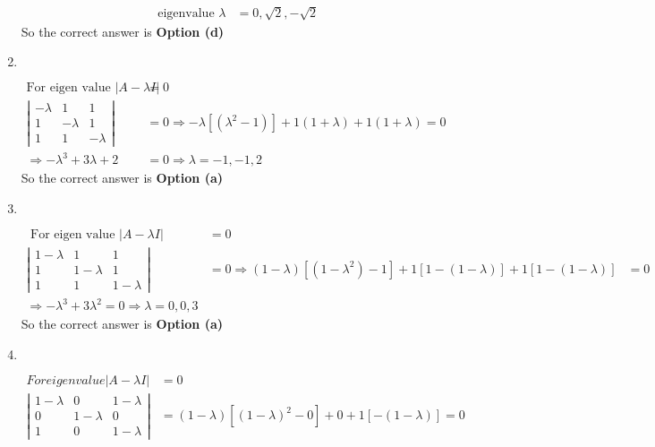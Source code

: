 \begin{enumerate}
\begin{answer}
\begin{align*}
		\text { eigenvalue } \lambda&=0, \sqrt{2},-\sqrt{2}
		\end{align*}
		So the correct answer is \textbf{Option (d)}
	\end{answer}
	\item $\left. \right. $
	\begin{answer}
		\begin{align*}
		 \text{For eigen value }|A-\lambda I|&=0\\
		\left|\begin{array}{ccc}
		-\lambda & 1 & 1 \\
		1 & -\lambda & 1 \\
		1 & 1 & -\lambda
		\end{array}\right|&=0 \Rightarrow-\lambda\left[\left(\lambda^{2}-1\right)\right]+1(1+\lambda)+1(1+\lambda)=0 \\
		\Rightarrow-\lambda^{3}+3 \lambda+2&=0 \Rightarrow \lambda=-1,-1,2
		\end{align*}
		So the correct answer is \textbf{Option (a)}		
	\end{answer}
	\item $\left. \right. $
	\begin{answer}
		\begin{align*}
	\text{ For eigen value }|A-\lambda I|&=0\\
		\left|\begin{array}{ccc}
		1-\lambda & 1 & 1 \\
		1 & 1-\lambda & 1 \\
		1 & 1 & 1-\lambda
		\end{array}\right|&=0 \Rightarrow(1-\lambda)\left[\left(1-\lambda^{2}\right)-1\right]+1[1-(1-\lambda)]+1[1-(1-\lambda)]&=0 \\
		\Rightarrow-\lambda^{3}+3 \lambda^{2}=0 \Rightarrow \lambda=0,0,3
		\end{align*}
		So the correct answer is \textbf{Option (a)}	
	\end{answer}
	\item $\left. \right. $
	\begin{answer}
		\begin{align*}
		 For eigen value |A-\lambda I|&=0\\
		\left|\begin{array}{ccc}
		1-\lambda & 0 & 1-\lambda \\
		0 & 1-\lambda & 0 \\
		1 & 0 & 1-\lambda
		\end{array}\right|&=(1-\lambda)\left[(1-\lambda)^{2}-0\right]+0+1[-(1-\lambda)]=0 \\

\end{align*}
\end{answer}
\end{enumerate}
